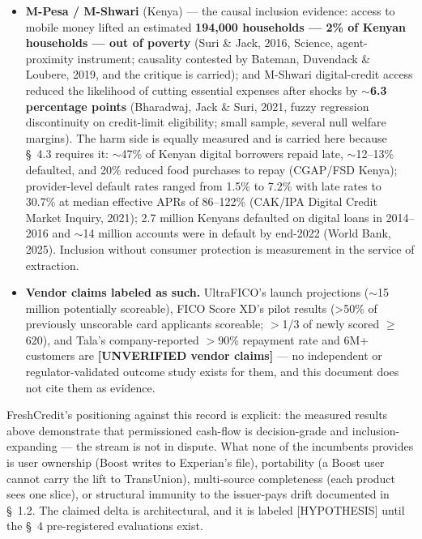 \documentclass[
]{article}
\newcounter{none} %
\begin{document}
\begin{itemize}
  risk sorting within score bands, and \textbf{no disparate impact
  detected among protected populations in the study samples} (small
  samples; authors' hedged language). The 2025 study found ML +
  cash-flow significantly increased predictiveness and expanded modeled
  credit access without increasing modeled default risk (§~2).
\item
  \textbf{M-Pesa / M-Shwari} (Kenya) --- the causal inclusion evidence:
  access to mobile money lifted an estimated \textbf{194,000 households
  --- 2\% of Kenyan households --- out of poverty} (Suri \& Jack, 2016,
  Science, agent-proximity instrument; causality contested by Bateman,
  Duvendack \& Loubere, 2019, and the critique is carried); and M-Shwari
  digital-credit access reduced the likelihood of cutting essential
  expenses after shocks by \textbf{\(\sim\)6.3 percentage points}
  (Bharadwaj, Jack \& Suri, 2021, fuzzy regression discontinuity on
  credit-limit eligibility; small sample, several null welfare margins).
  The harm side is equally measured and is carried here because §~4.3
  requires it: \(\sim\)47\% of Kenyan digital borrowers repaid late,
  \(\sim\)12--13\% defaulted, and 20\% reduced food purchases to repay
  (CGAP/FSD Kenya); provider-level default rates ranged from 1.5\% to
  7.2\% with late rates to 30.7\% at median effective APRs of 86--122\%
  (CAK/IPA Digital Credit Market Inquiry, 2021); 2.7 million Kenyans
  defaulted on digital loans in 2014--2016 and \(\sim\)14 million
  accounts were in default by end-2022 (World Bank, 2025). Inclusion
  without consumer protection is measurement in the service of
  extraction.
\item
  \textbf{Vendor claims labeled as such.} UltraFICO's launch projections
  (\(\sim\)15 million potentially scoreable), FICO Score XD's pilot
  results (\textgreater50\% of previously unscorable card applicants
  scoreable; \(>\)1/3 of newly scored \(\geq\)620), and Tala's
  company-reported \(>\)90\% repayment rate and 6M+ customers are
  \textbf{{[}UNVERIFIED vendor claims{]}} --- no independent or
  regulator-validated outcome study exists for them, and this document
  does not cite them as evidence.
\end{itemize}

FreshCredit's positioning against this record is explicit: the measured
results above demonstrate that permissioned cash-flow is decision-grade
and inclusion-expanding --- the stream is not in dispute. What none of
the incumbents provides is user ownership (Boost writes to Experian's
file), portability (a Boost user cannot carry the lift to TransUnion),
multi-source completeness (each product sees one slice), or structural
immunity to the issuer-pays drift documented in §~1.2. The claimed delta
is architectural, and it is labeled {[}HYPOTHESIS{]} until the §~4
pre-registered evaluations exist.
\end{document}
